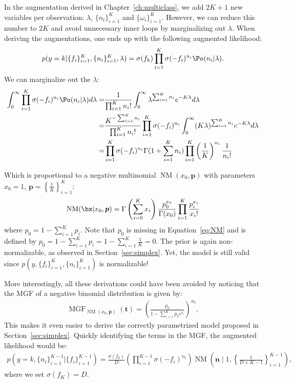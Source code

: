 In the augmentation derived in Chapter~\ref{ch:multiclass}, we add $2K + 1$ new variables per observation: $\lambda$, $\{n_i\}_{i=1}^K$ and $\{\omega_i\}_{i=1}^K$.
However, we can reduce this number to $2K$ and avoid unnecessary inner loops by marginalizing out $\lambda$.
When deriving the augmentations, one ends up with the following augmented likelihood:
\begin{align}
    p(y=k|\{f_i\}_{i=1}^K,\{n_i\}_{i=1}^K,\lambda) = \sigma(f_k) \prod_{i=1}^K \sigma(-f_i)^{n_i} \Po (n_i|\lambda).
\end{align}
We can marginalize out the $\lambda$:
\begin{align}
    \int_{0}^\infty \prod_{i=1}^K \sigma(-f_i)^{n_i} \Po (n_i|\lambda)d\lambda =& \frac{1}{\prod_{i=1}^K n_i!}\int_{0}^\infty \lambda^{\sum_{i=1}^K n_i}e^{-K\lambda}d\lambda \nonumber\\
    =& \frac{K^{-\sum_{i=1}^K n_i}}{\prod_{i=1}^K n_i!}\prod_{i=1}^K \sigma(-f_i)^{n_i} \int_{0}^\infty (K\lambda)^{\sum_{i=1}^K n_i}e^{-K\lambda}d\lambda \nonumber\\
    =& \prod_{i=1}^K\sigma(-f_i)^{n_i}\Gamma(1 + \sum_{i=1}^K n_i) \prod_{i=1}^K \left(\frac{1}{K}\right)^{n_i}\frac{1}{n_i!} \label{eq:NM}
\end{align}

Which is proportional to a negative multinomial $\operatorname{NM}(x_0, \boldsymbol{p})$ with parameters $x_0=1$, $\boldsymbol{p}=\left\{\frac{1}{K}\right\}_{i=1}^K$:
\begin{align*}
    \operatorname{NM}(\bx|x_0,\boldsymbol{p}) = \Gamma\left(\sum_{i=0}^K x_i\right) \frac{p_0^{x_0}}{\Gamma(x_0)}\prod_{i=1}^K \frac{p_i^{x_i}}{x_i!}   
\end{align*}
where $p_0 = 1 - \sum_{i=1}^K p_i$.
Note that $p_0$ is missing in Equation~\ref{eq:NM} and is defined by $p_0= 1 - \sum_{i=1}^K p_i = 1 - \sum_{i=1}^{K}\frac{1}{K} = 0$.
The prior is again non-normalizable, as observed in Section~\ref{sec:simplex}.
Yet, the model is still valid since $p(y,\{f_i\}_{i=1}^K,\{n_i\}_{i=1}^K)$ is normalizable!

More interestingly, all these derivations could have been avoided by noticing that the \ac{MGF} of a negative binomial distribution is given by:
\begin{align*}
    \operatorname{MGF}_{\operatorname{NM}(x_0,\boldsymbol{p})}(\boldsymbol{t}) = \left(\frac{p_0}{1-\sum_{i=1}^K p_k e^{t_i}}\right)^{x_0},
\end{align*}
This makes it even easier to derive the correctly parametrized model proposed in Section~\ref{sec:simplex}.
Quickly identifying the terms in the \ac{MGF}, the augmented likelihood would be:
\begin{align*}
    p\left(y=k,\{n_i\}_{i=1}^{K-1}|\{f_i\}_{i=1}^{K-1}\right) = \frac{\sigma(f_k)}{D}\left(\prod_{i=1}^{K-1}\sigma(-f_i)^{n_i}\right)\operatorname{NM}\left(\boldsymbol{n}\mid 1, \left\{\frac{1}{D+K-1}\right\}_{i=1}^{K-1}\right),
\end{align*}
where we set $\sigma(f_K) = D$.

